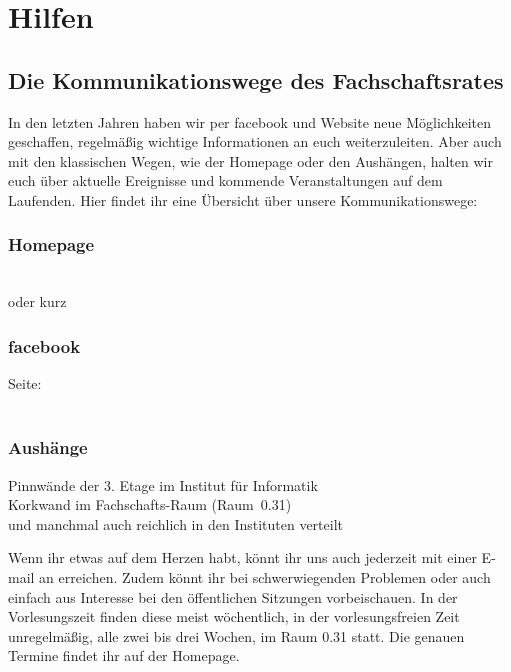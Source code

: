 
\section{Hilfen}
\subsection[Kommunikationswege des FSR]{Die Kommunikationswege des Fachschaftsrates}
In den letzten Jahren haben wir per facebook und Website neue Mög\-lich\-kei\-ten geschaffen, regelmäßig wichtige Informationen an euch
weiterzuleiten.
Aber auch mit den klassischen Wegen, wie der Homepage oder den Aushängen, halten wir euch über aktuelle Ereignisse und kommende Veranstaltungen
auf dem Laufenden.
Hier findet ihr eine Übersicht über unsere Kommunikationswege:

\subsubsection{Homepage}
 \\
oder kurz 
\subsubsection{facebook}
%	
Seite:  \\
 \\
\subsubsection{Aushänge}
Pinnwände der 3. Etage im Institut für Informatik \\
Korkwand im Fachschafts-Raum (Raum~0.31) \\
und manchmal auch reichlich in den Instituten verteilt

Wenn ihr etwas auf dem Herzen habt, könnt ihr uns auch jederzeit mit einer E-mail an  erreichen.
Zudem könnt ihr bei schwerwiegenden Problemen oder auch einfach aus Interesse bei den öffentlichen Sitzungen vorbeischauen.
In der Vorlesungszeit finden diese meist wöchentlich, in der vorlesungsfreien Zeit unregelmäßig, alle zwei bis drei Wochen, im Raum 0.31 statt.
Die genauen Termine findet ihr auf der Homepage.

